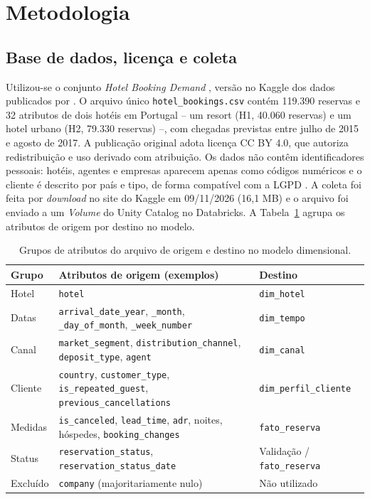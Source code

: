 \documentclass[11pt,a4paper]{article}
\begin{document}
\section{Metodologia}\label{sec:metodo}

\subsection{Base de dados, licença e coleta}
Utilizou-se o conjunto \textit{Hotel Booking Demand} \citep{mostipak2020}, versão no Kaggle dos dados publicados por \citet{antonio2019}. O arquivo único \texttt{hotel\_bookings.csv} contém 119.390 reservas e 32 atributos de dois hotéis em Portugal -- um resort (H1, 40.060 reservas) e um hotel urbano (H2, 79.330 reservas) --, com chegadas previstas entre julho de 2015 e agosto de 2017. A publicação original adota licença CC BY 4.0, que autoriza redistribuição e uso derivado com atribuição. Os dados não contêm identificadores pessoais: hotéis, agentes e empresas aparecem apenas como códigos numéricos e o cliente é descrito por país e tipo, de forma compatível com a LGPD \citep{lgpd2018}. A coleta foi feita por \textit{download} no site do Kaggle em 09/11/2026 (16,1 MB) e o arquivo foi enviado a um \textit{Volume} do Unity Catalog no Databricks. A Tabela~\ref{tab:volume} agrupa os atributos de origem por destino no modelo.

\begin{table}[!htb]
\centering\small
\caption{Grupos de atributos do arquivo de origem e destino no modelo dimensional.}\label{tab:volume}
\begin{tabularx}{\textwidth}{@{}l X l@{}}
\toprule
\textbf{Grupo} & \textbf{Atributos de origem (exemplos)} & \textbf{Destino} \\
\midrule
Hotel & \texttt{hotel} & \texttt{dim\_hotel} \\
Datas & \texttt{arrival\_date\_year}, \texttt{\_month}, \texttt{\_day\_of\_month}, \texttt{\_week\_number} & \texttt{dim\_tempo} \\
Canal & \texttt{market\_segment}, \texttt{distribution\_channel}, \texttt{deposit\_type}, \texttt{agent} & \texttt{dim\_canal} \\
Cliente & \texttt{country}, \texttt{customer\_type}, \texttt{is\_repeated\_guest}, \texttt{previous\_cancellations} & \texttt{dim\_perfil\_cliente} \\
Medidas & \texttt{is\_canceled}, \texttt{lead\_time}, \texttt{adr}, noites, hóspedes, \texttt{booking\_changes} & \texttt{fato\_reserva} \\
Status & \texttt{reservation\_status}, \texttt{reservation\_status\_date} & Validação / \texttt{fato\_reserva} \\
Excluído & \texttt{company} (majoritariamente nulo) & Não utilizado \\
\bottomrule
\end{tabularx}
\end{table}
\end{document}
